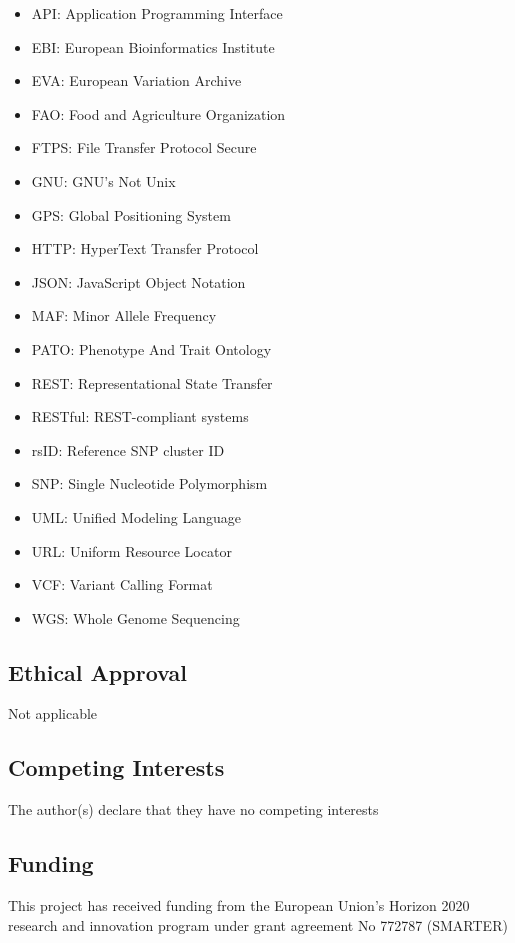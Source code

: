 \documentclass[a4paper,num-refs,gigabyte]{oup-contemporary}
\begin{document}
\begin{itemize}
\item API: Application Programming Interface
\item EBI: European Bioinformatics Institute
\item EVA: European Variation Archive
\item FAO: Food and Agriculture Organization
\item FTPS: File Transfer Protocol Secure
\item GNU: GNU's Not Unix
\item GPS: Global Positioning System
\item HTTP: HyperText Transfer Protocol
\item JSON: JavaScript Object Notation
\item MAF: Minor Allele Frequency
\item PATO: Phenotype And Trait Ontology
\item REST: Representational State Transfer
\item RESTful: REST-compliant systems
\item rsID: Reference SNP cluster ID
\item SNP: Single Nucleotide Polymorphism
\item UML: Unified Modeling Language
\item URL: Uniform Resource Locator
\item VCF: Variant Calling Format
\item WGS: Whole Genome Sequencing
\end{itemize}

\subsection{Ethical Approval}

Not applicable

\subsection{Competing Interests}

The author(s) declare that they have no competing interests

\subsection{Funding}

This project has received funding from the European Union’s Horizon 2020 research and innovation program under grant agreement No 772787 (SMARTER)
\end{document}
